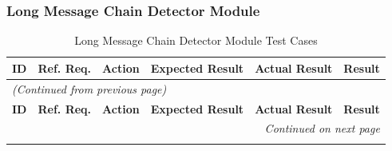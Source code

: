 \documentclass[12pt, titlepage]{article}
\begin{document}
\subsubsection{Long Message Chain Detector Module}

\begin{longtable}{c 
  >{\raggedright\arraybackslash}p{1.5cm} 
  >{\raggedright\arraybackslash}p{4.5cm} 
  >{\raggedright\arraybackslash}p{4cm} 
  >{\raggedright\arraybackslash}p{3cm} c}
  \toprule
  \textbf{ID} & \textbf{Ref. Req.} & \textbf{Action} & \textbf{Expected Result} & \textbf{Actual Result} & \textbf{Result} \\ 
  \midrule
  \endfirsthead

  \multicolumn{6}{l}{\textit{(Continued from previous page)}} \\ 
  \toprule
  \textbf{ID} & \textbf{Ref. Req.} & \textbf{Action} & \textbf{Expected Result} & \textbf{Actual Result} & \textbf{Result} \\ 
  \midrule
  \endhead

  \multicolumn{6}{r}{\textit{Continued on next page}} \\
  \endfoot

  \bottomrule
  \caption{Long Message Chain Detector Module Test Cases}
  \label{table:lmc_tests}
  \endlastfoot


\end{longtable}
\end{document}
